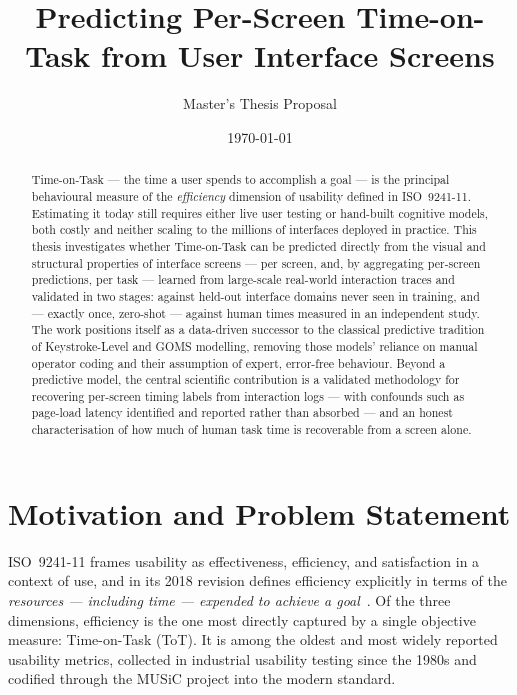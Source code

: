 \documentclass[11pt,a4paper]{article}
\title{\vspace{-2.2em}\bfseries\color{accent} Predicting Per-Screen Time-on-Task from User Interface Screens}
\author{\normalsize Master's Thesis Proposal}
\date{\normalsize \today}
\begin{document}
\maketitle
\vspace{-2.2em}

\begin{abstract}
\noindent
Time-on-Task --- the time a user spends to accomplish a goal --- is the principal behavioural measure of the \emph{efficiency} dimension of usability defined in ISO~9241-11. Estimating it today still requires either live user testing or hand-built cognitive models, both costly and neither scaling to the millions of interfaces deployed in practice. This thesis investigates whether Time-on-Task can be predicted directly from the visual and structural properties of interface screens --- per screen, and, by aggregating per-screen predictions, per task --- learned from large-scale real-world interaction traces and validated in two stages: against held-out interface domains never seen in training, and --- exactly once, zero-shot --- against human times measured in an independent study. The work positions itself as a data-driven successor to the classical predictive tradition of Keystroke-Level and GOMS modelling, removing those models' reliance on manual operator coding and their assumption of expert, error-free behaviour. Beyond a predictive model, the central scientific contribution is a validated methodology for recovering per-screen timing labels from interaction logs --- with confounds such as page-load latency identified and reported rather than absorbed --- and an honest characterisation of how much of human task time is recoverable from a screen alone.
\end{abstract}

\section{Motivation and Problem Statement}
ISO~9241-11 frames usability as effectiveness, efficiency, and satisfaction in a context of use, and in its 2018 revision defines efficiency explicitly in terms of the \emph{resources --- including time --- expended to achieve a goal}~\cite{iso9241}. Of the three dimensions, efficiency is the one most directly captured by a single objective measure: Time-on-Task (ToT). It is among the oldest and most widely reported usability metrics, collected in industrial usability testing since the 1980s and codified through the MUSiC project into the modern standard.
\end{document}
